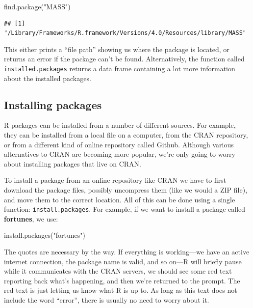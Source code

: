 \documentclass[
]{book}
\newenvironment{Shaded}{\begin{snugshade}}{\end{snugshade}}
\newcommand{\FunctionTok}[1]{\textcolor[rgb]{0.00,0.00,0.00}{#1}}
\newcommand{\NormalTok}[1]{#1}
\newcommand{\StringTok}[1]{\textcolor[rgb]{0.31,0.60,0.02}{#1}}
\begin{document}
\begin{Shaded}
\begin{Highlighting}[]
\FunctionTok{find.package}\NormalTok{(}\StringTok{"MASS"}\NormalTok{)}
\end{Highlighting}
\end{Shaded}

\begin{verbatim}
## [1] "/Library/Frameworks/R.framework/Versions/4.0/Resources/library/MASS"
\end{verbatim}

This either prints a ``file path'' showing us where the package is located, or returns an error if the package can't be found. Alternatively, the function called \texttt{installed.packages} returns a data frame containing a lot more information about the installed packages.

\hypertarget{installing-packages}{%
\subsection{Installing packages}\label{installing-packages}}

R packages can be installed from a number of different sources. For example, they can be installed from a local file on a computer, from the CRAN repository, or from a different kind of online repository called Github. Although various alternatives to CRAN are becoming more popular, we're only going to worry about installing packages that live on CRAN.

To install a package from an online repository like CRAN we have to first download the package files, possibly uncompress them (like we would a ZIP file), and move them to the correct location. All of this can be done using a single function: \texttt{install.packages}. For example, if we want to install a package called \textbf{fortunes}, we use:

\begin{Shaded}
\begin{Highlighting}[]
\FunctionTok{install.packages}\NormalTok{(}\StringTok{"fortunes"}\NormalTok{)}
\end{Highlighting}
\end{Shaded}

The quotes are necessary by the way. If everything is working---we have an active internet connection, the package name is valid, and so on---R will briefly pause while it communicates with the CRAN servers, we should see some red text reporting back what's happening, and then we're returned to the prompt. The red text is just letting us know what R is up to. As long as this text does not include the word ``error'', there is usually no need to worry about it.
\end{document}
